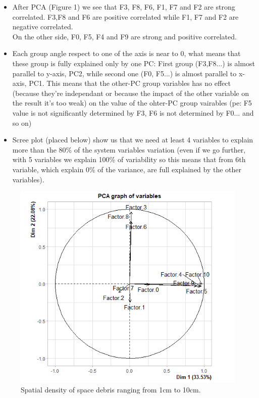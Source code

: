 \documentclass[12pt]{article}
\begin{document}
\begin{itemize}
\item After PCA (Figure 1) we see that F3, F8, F6, F1, F7 and F2 are strong correlated. F3,F8 and F6 are positive correlated while F1, F7 and F2 are negative correlated.\\ On the other side, F0, F5, F4 and F9 are strong and positive correlated.
\item Each group angle respect to one of the axis is near to 0, what means that these group is fully explained only by one PC: First group (F3,F8...) is almost parallel to y-axis, PC2, while second one (F0, F5...) is almost parallel to x-axis, PC1. 
This means that the other-PC group variables has no effect (because they're independant or because the impact of the other variable on the result it's too weak) on the value of the ohter-PC group vairables (pe: F5 value is not significantly determined by F3, F6 is not determined by F0... and so on)
\item Scree plot (placed below) show us that we need at least 4 variables to explain more than the 80\% of the system variables variation (even if we go further, with 5 variables we explain 100\% of variability so this means that from 6th variable, which explain 0\% of the variance, are full explained by the other variables).
\end{itemize}
\newpage
\begin{figure}[!htb]
    \centering
	\includegraphics[scale=0.7]{pca.PNG}
    \caption{Spatial density of space debris ranging from 1cm to 10cm.}
    \label{top}
\end{figure} 
\end{document}

